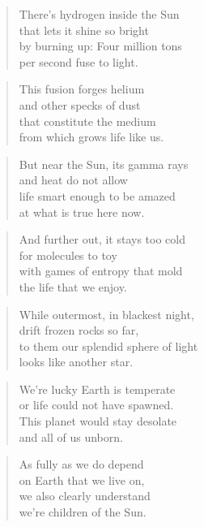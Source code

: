 \documentclass[10pt,a4paper]{article}
\begin{document}
\begin{paracol}{2}
\begin{verse}
There’s hydrogen inside the Sun\\
that lets it shine so bright\\
by burning up: Four million tons\\
per second fuse to light.
\end{verse}

\begin{verse}
This fusion forges helium\\
and other specks of dust\\
that constitute the medium\\
from which grows life like us.
\end{verse}

\begin{verse}
But near the Sun, its gamma rays\\
and heat do not allow\\
life smart enough to be amazed\\
at what is true here now.
\end{verse}

\begin{verse}
And further out, it stays too cold\\
for molecules to toy\\
with games of entropy that mold\\
the life that we enjoy.
\end{verse}

\begin{verse}
While outermost, in blackest night,\\
drift frozen rocks so far,\\
to them our splendid sphere of light\\
looks like another star.
\end{verse}

\begin{verse}
We’re lucky Earth is temperate\\
or life could not have spawned.\\
This planet would stay desolate\\
and all of us unborn.
\end{verse}

\begin{verse}
As fully as we do depend\\
on Earth that we live on,\\
we also clearly understand\\
we’re children of the Sun.
\end{verse}


\end{paracol}
\end{document}
